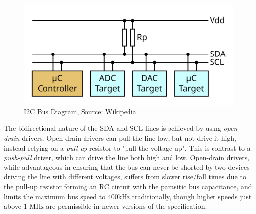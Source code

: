\documentclass[main.tex]{subfiles}
\begin{document}
\begin{figure}[H]
    \centering
    \includegraphics[scale=0.09]{images/I2C_controller-target.png}
    \caption{I2C Bus Diagram, Source: Wikipedia \cite{wikipedia_i2c_bus_image}}
    \label{fig:i2c_bus}
\end{figure}

\noindent The bidirectional nature of the SDA and SCL lines is achieved by using \textit{open-drain} drivers. Open-drain drivers can pull the line low, but not drive it high, instead relying on a \textit{pull-up} resistor to "pull the voltage up". This is contrast to a \textit{push-pull} driver, which can drive the line both high and low. Open-drain drivers, while advantageous in ensuring that the bus can never be shorted by two devices driving the line with different voltages, suffers from slower rise/fall times due to the pull-up resistor forming an RC circuit with the parasitic bus capacitance, and limits the maximum bus speed to 400kHz traditionally, though higher speeds just above 1 MHz are permissible in newer versions of the specification.
\end{document}
